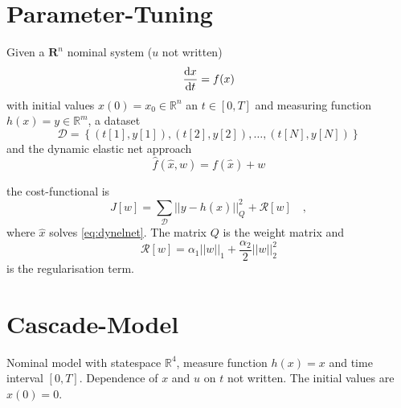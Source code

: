 







\section{Parameter-Tuning}
Given a $\mathbf{R}^n$ nominal system ($u$ not written)
\begin{align}
\frac{\text{d} x}{\text{d} t} = f(x)
\end{align}
with initial values $x(0) = x_0 \in \mathbb{R}^n$ an $t\in [0,T]$ and measuring function 
$h(x) = y \in \mathbb{R}^m$, a dataset
\begin{equation}
\mathcal{D} = \left\{ (t[1],y[1]), (t[2],y[2]),\ldots , (t[N],y[N]) \right\}
\end{equation}
and the dynamic elastic net approach
\begin{equation}
\hat{f}(\hat{x},w) = f(\hat{x}) + w \label{eq:dynelnet}
\end{equation}


the cost-functional is
\begin{equation}
J[w] = \sum\limits_{\mathcal{D}} || y - h(\hat{x}) ||_Q^2 + \mathcal{R}[w] \quad ,
\end{equation}
where $\hat{x}$ solves \eqref{eq:dynelnet}. The matrix $Q$ is the weight matrix 
and 
\begin{equation}
\mathcal{R}[w] = \alpha_1 ||w||_1 + \frac{\alpha_2}{2} ||w||_2^2
\end{equation}
is the regularisation term.



\section{Cascade-Model}
Nominal model with statespace $\mathbb{R}^4$, measure function $h(x) = x$ 
and time interval $[0,T]$. Dependence of $x$ and $u$ on $t$ not written. The initial 
values are $x(0)=0$.

